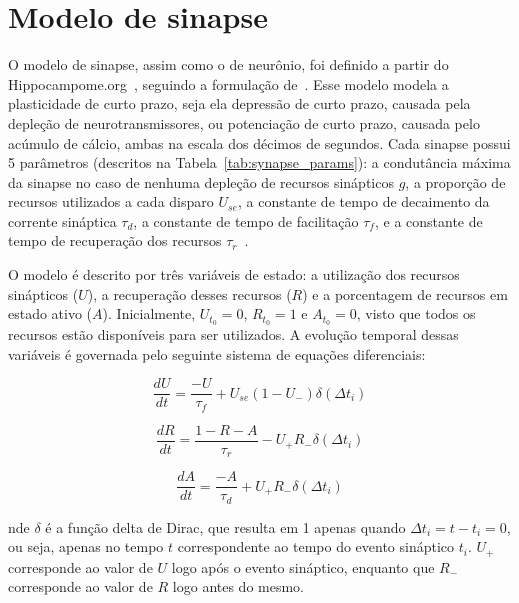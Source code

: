 

\section{Modelo de sinapse}

O modelo de sinapse, assim como o de neurônio, foi definido a partir do Hippocampome.org~\cite{wheelerHippocampomeorg2023},
seguindo a formulação de~. Esse modelo modela a
plasticidade de curto prazo, seja ela depressão de curto prazo, causada pela depleção de neurotransmissores, ou potenciação de
curto prazo, causada pelo acúmulo de cálcio, ambas na escala dos décimos de segundos. Cada sinapse possui 5 parâmetros (descritos
na Tabela~\ref{tab:synapse_params}): a condutância máxima da sinapse no caso de nenhuma depleção de recursos sinápticos $g$, a proporção de
recursos utilizados a cada disparo $U_{se}$, a constante de tempo de decaimento da corrente sináptica $\tau_d$,
a constante de tempo de facilitação $\tau_f$, e a constante de tempo de recuperação dos recursos $\tau_r$~\cite{moradiNormalized2022}.

O modelo é descrito por três variáveis de estado: a utilização dos recursos sinápticos ($U$), a recuperação desses recursos ($R$)
e a porcentagem de recursos em estado ativo ($A$). Inicialmente, $U_{t_0} = 0$, $R_{t_0} = 1$ e $A_{t_0} = 0$, 
visto que todos os recursos estão disponíveis para ser utilizados. A evolução temporal dessas
variáveis é governada pelo seguinte sistema de equações diferenciais:

\begin{equation}
    \label{eq_tsodyks_dU}
    \frac{dU}{dt} = \frac{-U}{\tau_f} + U_{se}(1-U_{-}) \delta(\Delta t_i)
\end{equation}

\begin{equation}
    \label{eq_tsodyks_dR}
    \frac{dR}{dt} = \frac{1-R-A}{\tau_r} - U_{+} R_{-} \delta(\Delta t_i)
\end{equation}

\begin{equation}
    \label{eq_tsodyks_dA}
    \frac{dA}{dt} = \frac{-A}{\tau_d} + U_{+} R_{-} \delta(\Delta t_i)
\end{equation}

nde $\delta$ é a função delta de Dirac, que resulta em 1 apenas quando $\Delta t_i = t - t_i = 0$, ou seja, apenas no tempo $t$
correspondente ao tempo do evento sináptico $t_i$. $U_{+}$ corresponde ao valor de $U$ logo após o evento sináptico, enquanto que
$R_{-}$ corresponde ao valor de $R$ logo antes do mesmo.


